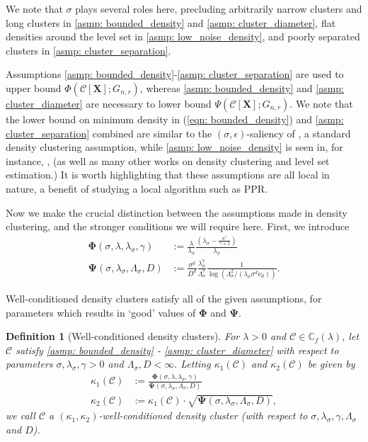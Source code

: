 \documentclass{article}
\newcommand{\1}{\mathbf{1}}
\newcommand{\Phibf}{\mathbf{\Phi}}
\newcommand{\Psibf}{\mathbf{\Psi}}
\newcommand{\Xbf}{\mathbf{X}}
\newcommand{\Cbb}{\mathbb{C}}
\newcommand{\Cset}{\mathcal{C}}
\theoremstyle{aldenthm}
\newtheorem{definition}{Definition}
\theoremstyle{remark}
\begin{document}
We note that $\sigma$ plays several roles here, precluding arbitrarily narrow clusters and long clusters in \ref{asmp: bounded_density} and \ref{asmp: cluster_diameter}, flat densities around the level set in \ref{asmp: low_noise_density}, and poorly separated clusters in \ref{asmp: cluster_separation}.

Assumptions \ref{asmp: bounded_density}-\ref{asmp: cluster_separation} are used to upper bound $\Phi(\Cset[\Xbf]; G_{n,r})$, whereas \ref{asmp: bounded_density} and \ref{asmp: cluster_diameter} are necessary to lower bound $\Psi(\Cset[\Xbf]; G_{n,r})$. We note that the lower bound on minimum density in (\ref{eqn: bounded_density}) and \ref{asmp: cluster_separation} combined are similar to the $(\sigma,\epsilon)$-saliency of \cite{chaudhuri2010}, a standard density clustering assumption, while \ref{asmp: low_noise_density} is seen in, for instance, \cite{singh2009}, (as well as many other works on density clustering and level set estimation.) It is worth highlighting that these assumptions are all local in nature, a benefit of studying a local algorithm such as PPR.

Now we make the crucial distinction between the assumptions made in density clustering, and the stronger conditions we will require here. First, we introduce
\begin{align*}
\mathbf{\Phi}(\sigma, \lambda,\lambda_{\sigma},\gamma) & := \frac{\lambda}{\lambda_{\sigma}} \frac{(\lambda_{\sigma} - \frac{\sigma^{\gamma}}{\gamma+1})}{\lambda_{\sigma}} \\
\mathbf{\Psi}(\sigma, \lambda_{\sigma}, \Lambda_{\sigma}, D) & := \frac{\sigma^d}{D^d} \frac{\lambda_{\sigma}^7}{\Lambda_{\sigma}^7} \frac{1}{\log(\Lambda_{\sigma}^2/(\lambda_{\sigma} \sigma^d \nu_d))}.
\end{align*}

Well-conditioned density clusters satisfy all of the given assumptions, for parameters which results in `good' values of $\Phibf$ and $\Psibf$.
\begin{definition}[Well-conditioned density clusters]
	For $\lambda > 0$ and $\Cset \in \Cbb_f(\lambda)$, let $\Cset$ satisfy \ref{asmp: bounded_density} - \ref{asmp: cluster_diameter} with respect to parameters $\sigma, \lambda_{\sigma}, \gamma > 0$ and $\Lambda_{\sigma}, D < \infty.$ Letting $\kappa_1(\Cset)$ and $\kappa_2(\Cset)$ be given by
	\begin{align*}
	\kappa_1(\Cset) & := \frac{\mathbf{\Phi}(\sigma, \lambda,\lambda_{\sigma},\gamma)}{\mathbf{\Psi}(\sigma, \lambda_{\sigma}, \Lambda_{\sigma}, D)} \\
	\kappa_2(\Cset) & := \kappa_1(\Cset) \cdot \sqrt{\mathbf{\Psi}(\sigma, \lambda_{\sigma}, \Lambda_{\sigma}, D)},
	\end{align*}
	we call $\Cset$ a \textrm{$(\kappa_1, \kappa_2)$-well-conditioned density cluster (with respect to $\sigma, \lambda_{\sigma}, \gamma, \Lambda_{\sigma}$ and $D$).}
\end{definition}
\end{document}
